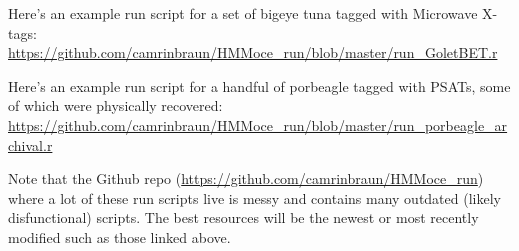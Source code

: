 \documentclass{article}\usepackage[]{graphicx}\usepackage[]{color}
\begin{document}
Here's an example run script for a set of bigeye tuna tagged with Microwave X-tags:
\url{https://github.com/camrinbraun/HMMoce_run/blob/master/run_GoletBET.r}

Here's an example run script for a handful of porbeagle tagged with PSATs, some of which were physically recovered:
\url{https://github.com/camrinbraun/HMMoce_run/blob/master/run_porbeagle_archival.r}

Note that the Github repo (\url{https://github.com/camrinbraun/HMMoce_run}) where a lot of these run scripts live is messy and contains many outdated (likely disfunctional) scripts. The best resources will be the newest or most recently modified such as those linked above.



\end{document}
